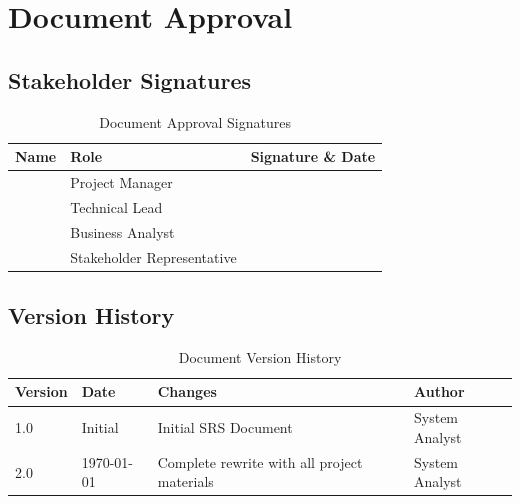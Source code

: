 \documentclass[12pt,a4paper]{article}
\begin{document}
\section{Document Approval}

\subsection{Stakeholder Signatures}
\begin{table}[H]
\centering
\begin{tabular}{|p{4cm}|p{4cm}|p{4cm}|}
\hline
\textbf{Name} & \textbf{Role} & \textbf{Signature \& Date} \\
\hline
 & Project Manager &  \\
\hline
 & Technical Lead &  \\
\hline
 & Business Analyst &  \\
\hline
 & Stakeholder Representative &  \\
\hline
\end{tabular}
\caption{Document Approval Signatures}
\end{table}

\subsection{Version History}
\begin{table}[H]
\centering
\begin{tabular}{|p{2cm}|p{3cm}|p{4cm}|p{3cm}|}
\hline
\textbf{Version} & \textbf{Date} & \textbf{Changes} & \textbf{Author} \\
\hline
1.0 & Initial & Initial SRS Document & System Analyst \\
\hline
2.0 & \today & Complete rewrite with all project materials & System Analyst \\
\hline
\end{tabular}
\caption{Document Version History}
\end{table}
\end{document}
